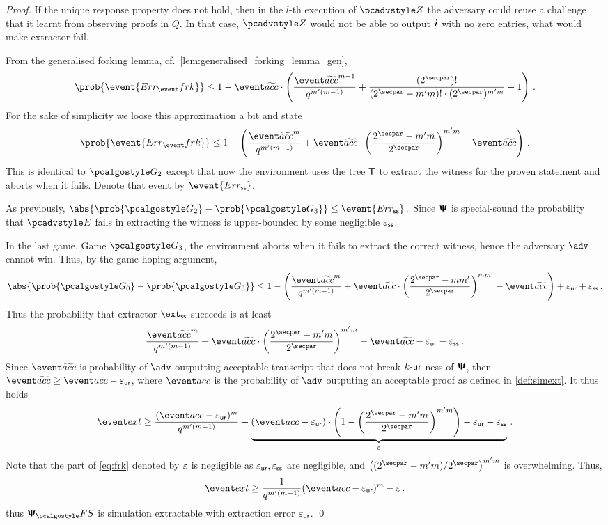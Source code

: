 \documentclass[runningheads,11pt]{llncs}
\def\vec#1{\mathchoice{\mbox{\boldmath$\displaystyle#1$}}
{\mbox{\boldmath$\textstyle#1$}} {\mbox{\boldmath$\scriptstyle#1$}}
{\mbox{\boldmath$\scriptscriptstyle#1$}}}
\theoremstyle{definition} \newtheorem{definition}[theorem]{Definition}
\begin{document}
\begin{proof}
If the unique response property does not hold, then in the $l$-th execution of
$\zdv$ the adversary could reuse a challenge that it learnt from observing
proofs in $Q$. In that case, $\zdv$ would not be able to output $\vec{i}$ with
no zero entries, what would make extractor fail.

From the generalised forking lemma, cf.~\cref{lem:generalised_forking_lemma_gen},
\[ \prob{\event{\errfrk}} \leq 1 - \waccProb \cdot \left(\frac{\waccProb^{m -
        1}}{q^{m'(m - 1)}} + \frac{(2^\secpar) !}{(2^\secpar - m' m)! \cdot
      (2^\secpar)^{m' m}} - 1\right)\,.
\]
For the sake of simplicity we loose this approximation a bit and state
\[
	\prob{\event{\errfrk}} \leq 1 -
	\left(\frac{\waccProb^{m}}{q^{m' (m - 1)}} +
		\waccProb \cdot \left(\frac{2^\secpar - m' m}{2^\secpar}\right)^{m' m} -
	\waccProb\right)\,.
\]
 This is identical to $\game{2}$ except that now the environment uses
the tree $\mathsf{T}$ to extract the witness for the proven statement and aborts when
it fails. Denote that event by $\event{\errss}$.

As previously, 
\(
	\abs{\prob{\game{2}} - \prob{\game{3}}} \leq \event{\errss}\,.
	\)
Since $\bm{\mathsf{\Psi}}$ is special-sound the probability that $\env$ fails in extracting
the witness is upper-bounded by some negligible $\varepsilon_{\mathsf{ss}}$.

In the last game, Game $\game{3}$, the environment aborts when it fails to
extract the correct witness, hence the adversary $\advse$ cannot win.  Thus,
by the game-hoping argument, 
\[
	\abs{\prob{\game{0}} - \prob{\game{3}}} \leq 1 -
	\left(\frac{\waccProb^{m}}{q^{m' (m - 1)}} + \waccProb \cdot
	\left(\frac{2^\secpar - mm'}{2^\secpar}\right)^{m m'} - \waccProb\right) + \epsur + \epsss\,.
\]
Thus the probability that extractor $\extss$ succeeds is at least
\[
	\frac{\waccProb^{m}}{q^{m' (m - 1)}} + 
	\waccProb \cdot
	\left( \frac{2^\secpar - m' m}{2^\secpar}\right)^{m' m} -
\waccProb - \epsur - \epsss\,.
\]
Since $\waccProb$ is probability of $\advse$ outputting acceptable transcript
that does not break ${k\text{-}\mathsf{ur}}$-ness of $\bm{\mathsf{\Psi}}$, then $\waccProb \geq \accProb -
\epsur$, where $\accProb$ is the probability of $\advse$ outputing an acceptable
proof as defined in \cref{def:simext}. It thus holds
\[
	\label{eq:frk}
	\extProb \geq \frac{(\accProb - \epsur)^{m}}{q^{m' (m - 1)}} -
	\underbrace{(\accProb - \epsur) \cdot \left( 1 -
		\left(\frac{2^\secpar - m' m}{2^\secpar}\right)^{m' m}\right)
- \epsur - \epsss}_{\eps}\,.
\]
Note that the part of \cref{eq:frk} denoted by $\varepsilon$ is negligible as
$\varepsilon_{\mathsf{ur}}, \varepsilon_{\mathsf{ss}}$ are negligible, and $\left(\infrac{(2^\secpar
- m' m)}{2^\secpar}\right)^{m' m}$ is overwhelming.
Thus, 
\[
	\extProb \geq \frac{1}{q^{m' (m - 1)}} (\accProb - \epsur)^{m} -\eps\,.
\] 
thus
$\psfs$ is simulation extractable with extraction error $\varepsilon_{\mathsf{ur}}$.
\qed
\end{proof}
\end{document}
